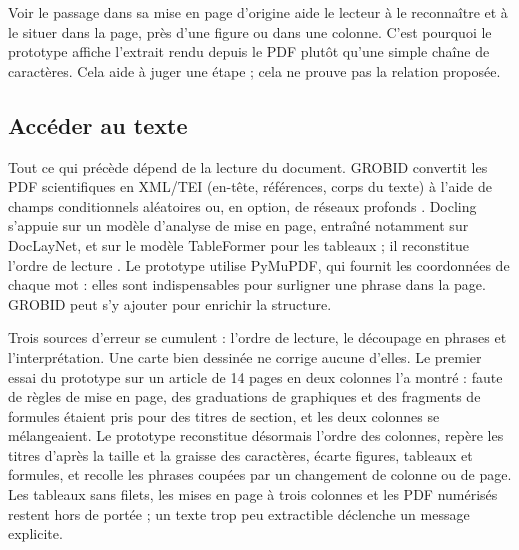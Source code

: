 Voir le passage dans sa mise en page d’origine aide le lecteur à le reconnaître et à le situer dans la page, près d’une figure ou dans une colonne. C’est pourquoi le prototype affiche l’extrait rendu depuis le PDF plutôt qu’une simple chaîne de caractères. Cela aide à juger une étape ; cela ne prouve pas la relation proposée.

\subsection{Accéder au texte}

Tout ce qui précède dépend de la lecture du document. GROBID convertit les PDF scientifiques en XML/TEI (en-tête, références, corps du texte) à l’aide de champs conditionnels aléatoires ou, en option, de réseaux profonds \parencite{ref22}. Docling s’appuie sur un modèle d’analyse de mise en page, entraîné notamment sur DocLayNet, et sur le modèle TableFormer pour les tableaux ; il reconstitue l’ordre de lecture \parencite[2--3]{ref23}. Le prototype utilise PyMuPDF, qui fournit les coordonnées de chaque mot : elles sont indispensables pour surligner une phrase dans la page. GROBID peut s’y ajouter pour enrichir la structure.

Trois sources d’erreur se cumulent : l’ordre de lecture, le découpage en phrases et l’interprétation. Une carte bien dessinée ne corrige aucune d’elles. Le premier essai du prototype sur un article de 14 pages en deux colonnes l’a montré : faute de règles de mise en page, des graduations de graphiques et des fragments de formules étaient pris pour des titres de section, et les deux colonnes se mélangeaient. Le prototype reconstitue désormais l’ordre des colonnes, repère les titres d’après la taille et la graisse des caractères, écarte figures, tableaux et formules, et recolle les phrases coupées par un changement de colonne ou de page. Les tableaux sans filets, les mises en page à trois colonnes et les PDF numérisés restent hors de portée ; un texte trop peu extractible déclenche un message explicite.
